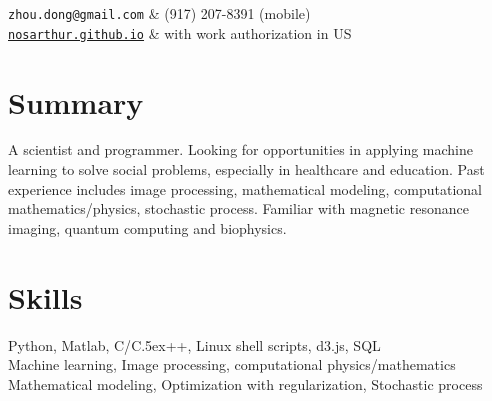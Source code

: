 \documentclass[centered,11pt,overlapped]{res}
\def\Cplusplus{{\rm C\raise.5ex\hbox{\small ++}}}
\begin{document}


\begin{resume}

\begin{ncolumn}{2}
   {\tt zhou.dong@gmail.com} &  (917) 207-8391 (mobile) \\
   {\tt \href{nosarthur.github.io}{nosarthur.github.io}} &  with work authorization in US
\end{ncolumn}


\section{\sc Summary}
A scientist and programmer. 
Looking for opportunities in applying machine learning to solve social problems, especially in healthcare and education.
Past experience includes image processing, mathematical modeling, computational mathematics/physics, stochastic process. Familiar with magnetic resonance imaging, quantum computing and biophysics.


\section{\sc Skills}
Python, Matlab, C/\Cplusplus, Linux shell scripts, d3.js, SQL \\
Machine learning, Image processing, computational physics/mathematics\\
Mathematical modeling, Optimization with regularization, Stochastic process 
\end{resume}
\end{document}
